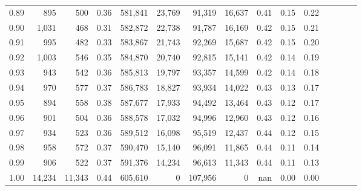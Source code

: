 \begin{tabular}{rrrcrrrrrrrrrrr}
0.89 &     895 &     500 &                                       0.36 &  581,841 &   23,769 &   91,319 &   16,637 &  0.41 &  0.15 &                         0.22 \\
0.90 &   1,031 &     468 &                                       0.31 &  582,872 &   22,738 &   91,787 &   16,169 &  0.42 &  0.15 &                         0.21 \\
0.91 &     995 &     482 &                                       0.33 &  583,867 &   21,743 &   92,269 &   15,687 &  0.42 &  0.15 &                         0.20 \\
0.92 &   1,003 &     546 &                                       0.35 &  584,870 &   20,740 &   92,815 &   15,141 &  0.42 &  0.14 &                         0.19 \\
0.93 &     943 &     542 &                                       0.36 &  585,813 &   19,797 &   93,357 &   14,599 &  0.42 &  0.14 &                         0.18 \\
0.94 &     970 &     577 &                                       0.37 &  586,783 &   18,827 &   93,934 &   14,022 &  0.43 &  0.13 &                         0.17 \\
0.95 &     894 &     558 &                                       0.38 &  587,677 &   17,933 &   94,492 &   13,464 &  0.43 &  0.12 &                         0.17 \\
0.96 &     901 &     504 &                                       0.36 &  588,578 &   17,032 &   94,996 &   12,960 &  0.43 &  0.12 &                         0.16 \\
0.97 &     934 &     523 &                                       0.36 &  589,512 &   16,098 &   95,519 &   12,437 &  0.44 &  0.12 &                         0.15 \\
0.98 &     958 &     572 &                                       0.37 &  590,470 &   15,140 &   96,091 &   11,865 &  0.44 &  0.11 &                         0.14 \\
0.99 &     906 &     522 &                                       0.37 &  591,376 &   14,234 &   96,613 &   11,343 &  0.44 &  0.11 &                         0.13 \\
1.00 &  14,234 &  11,343 &                                       0.44 &  605,610 &        0 &  107,956 &        0 &   nan &  0.00 &                         0.00 \\
\bottomrule
\end{tabular}
